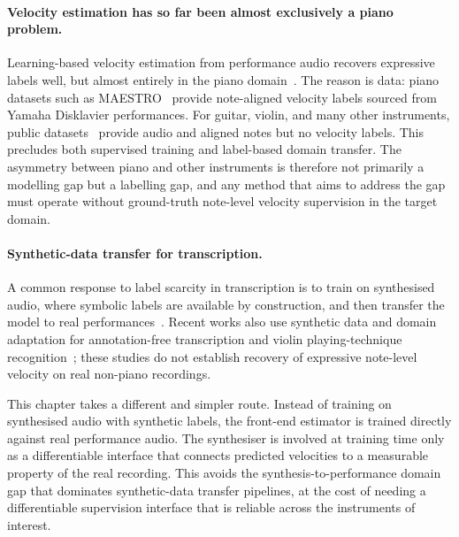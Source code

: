 \paragraph{Velocity estimation has so far been almost exclusively a piano problem.}
Learning-based velocity estimation from performance audio recovers expressive labels well, but almost entirely in the piano domain~\cite{jeong2018timbre, simonetta2022acoustics, kim2024method}. The reason is data: piano datasets such as MAESTRO~\cite{hawthorne2019maestro} provide note-aligned velocity labels sourced from Yamaha Disklavier performances. For guitar, violin, and many other instruments, public datasets~\cite{tamer2023violin, riley2024gaps, riley2024high} provide audio and aligned notes but no velocity labels. This precludes both supervised training and label-based domain transfer. The asymmetry between piano and other instruments is therefore not primarily a modelling gap but a labelling gap, and any method that aims to address the gap must operate without ground-truth note-level velocity supervision in the target domain.

\paragraph{Synthetic-data transfer for transcription.}
A common response to label scarcity in transcription is to train on synthesised audio, where symbolic labels are available by construction, and then transfer the model to real performances~\cite{maman2022general, zang2024synthtab, kusaka2025learn}. Recent works also use synthetic data and domain adaptation for annotation-free transcription and violin playing-technique recognition~\cite{sato2024annotationfree,wang2026vioptt}; these studies do not establish recovery of expressive note-level velocity on real non-piano recordings.

This chapter takes a different and simpler route. Instead of training on synthesised audio with synthetic labels, the front-end estimator is trained directly against real performance audio. The synthesiser is involved at training time only as a differentiable interface that connects predicted velocities to a measurable property of the real recording. This avoids the synthesis-to-performance domain gap that dominates synthetic-data transfer pipelines, at the cost of needing a differentiable supervision interface that is reliable across the instruments of interest.

